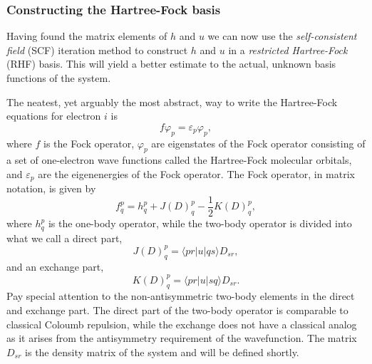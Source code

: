 \documentclass[
    a4paper, aps, twocolumn, floatfix, superscriptaddress,
    nofootinbib]{revtex4-1}
\newcommand{\1}{\mathds{1}}
\newcommand{\half}{\frac{1}{2}}
\newcommand{\bra}[1]{\langle #1\lvert}
\newcommand{\ket}[1]{\rvert #1\rangle}
\begin{document}
        \subsubsection{Constructing the Hartree-Fock basis}
            Having found the matrix elements of $h$ and $u$ we can now use the
            \emph{self-consistent field} (SCF) iteration method to construct $h$
            and $u$ in a \emph{restricted Hartree-Fock} (RHF) basis. This will
            yield a better estimate to the actual, unknown basis functions of
            the system.

            The neatest, yet arguably the most abstract, way to write the
            Hartree-Fock equations for electron $i$ is
            \begin{equation}
                f \varphi_p = \varepsilon_p \varphi_p,
            \end{equation}
            where $f$ is the Fock operator, $\varphi_p$ are eigenstates of the
            Fock operator consisting of a set of one-electron wave functions
            called the Hartree-Fock molecular orbitals, and $\varepsilon_p$ are
            the eigenenergies of the Fock operator. The Fock operator, in matrix
            notation, is given by
            \begin{equation}
                f^p_q = h^p_q + J(D)^p_q - \half K(D)^p_q,
            \end{equation}
            where $h^p_q$ is the one-body operator, while the two-body operator
            is divided into what we call a direct part,
            \begin{equation}
                J(D)^p_q = \bra{pr}u\ket{qs}D_{sr},
            \end{equation}
            and an exchange part,
            \begin{equation}
                K(D)^p_q = \bra{pr}u\ket{sq}D_{sr}.
            \end{equation}
            Pay special attention to the non-antisymmetric two-body elements in
            the direct and exchange part.  The direct part of the two-body
            operator is comparable to classical Coloumb repulsion, while the
            exchange does not have a classical analog as it arises from the
            antisymmetry requirement of the wavefunction. The matrix $D_{sr}$ is
            the density matrix of the system and will be defined shortly.
\end{document}
